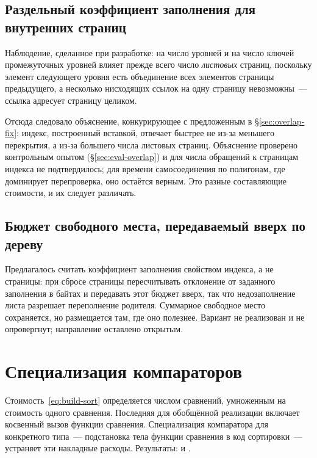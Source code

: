 \subsection{Раздельный коэффициент заполнения для внутренних страниц}

Наблюдение, сделанное при разработке: на число уровней и на число ключей
промежуточных уровней влияет прежде всего число \emph{листовых} страниц,
поскольку элемент следующего уровня есть объединение всех элементов страницы
предыдущего, а несколько нисходящих ссылок на одну страницу невозможны~---
ссылка адресует страницу целиком.

Отсюда следовало объяснение, конкурирующее с предложенным в
§\ref{sec:overlap-fix}: индекс, построенный вставкой, отвечает быстрее не
из-за меньшего перекрытия, а из-за большего числа листовых страниц. Объяснение
проверено контрольным опытом (§\ref{sec:eval-overlap}) и для числа обращений к
страницам индекса не подтвердилось; для времени самосоединения по полигонам,
где доминирует перепроверка, оно остаётся верным. Это разные составляющие
стоимости, и их следует различать.

\subsection{Бюджет свободного места, передаваемый вверх по дереву}

Предлагалось считать коэффициент заполнения свойством индекса, а не страницы:
при сбросе страницы пересчитывать отклонение от заданного заполнения в байтах и
передавать этот бюджет вверх, так что недозаполнение листа разрешает
переполнение родителя. Суммарное свободное место сохраняется, но размещается
там, где оно полезнее. Вариант не реализован и не опровергнут; направление
оставлено открытым.

\section{Специализация компараторов}

Стоимость~\eqref{eq:build-sort} определяется числом сравнений, умноженным на
стоимость одного сравнения. Последняя для обобщённой реализации включает
косвенный вызов функции сравнения. Специализация компаратора для конкретного
типа~--- подстановка тела функции сравнения в код сортировки~--- устраняет эти
накладные расходы. Результаты: 
и .

